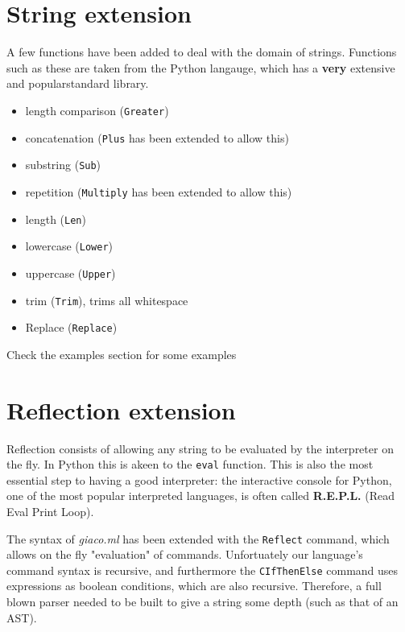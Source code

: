 \documentclass[11pt]{article}
\begin{document}
\section{String extension}
\label{sec:org45020ea}
A few functions have been added to deal with the domain of strings.
Functions such as these are taken from the Python langauge, which has a \textbf{very} extensive and popularstandard library.
\begin{itemize}
\item length comparison (\texttt{Greater})
\item concatenation (\texttt{Plus} has been extended to allow this)
\item substring (\texttt{Sub})
\item repetition (\texttt{Multiply} has been extended to allow this)
\item length (\texttt{Len})
\item lowercase (\texttt{Lower})
\item uppercase (\texttt{Upper})
\item trim (\texttt{Trim}), trims all whitespace
\item Replace (\texttt{Replace})
\end{itemize}

Check the examples section for some examples
\section{Reflection extension}
\label{sec:org82a2a16}
Reflection consists of allowing any string to be evaluated by the interpreter on the fly. In Python this is akeen to the \texttt{eval} function.
This is also the most essential step to having a good interpreter: the interactive console for Python,
 one of the most popular interpreted languages, is often called \textbf{R.E.P.L.} (Read Eval Print Loop).

The syntax of \emph{giaco.ml} has been extended with the \texttt{Reflect} command, which allows on the fly "evaluation" of commands.
Unfortuately our language's command syntax is recursive, and furthermore the \texttt{CIfThenElse} command
uses expressions as boolean conditions, which are also recursive.
Therefore, a full blown parser needed to be built to give a string some depth (such as that of an AST).
\end{document}
